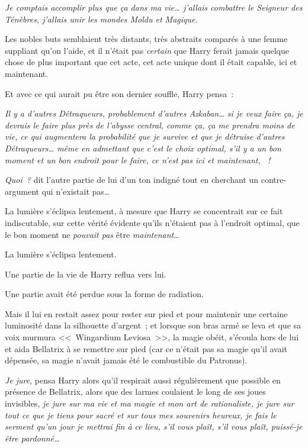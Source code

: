 \emph{Je comptais accomplir plus que ça dans ma vie… j'allais combattre le Seigneur des Ténèbres, j'allais unir les mondes Moldu et Magique.}

Les nobles buts semblaient très distants, très abstraits comparés à une femme suppliant qu'on l'aide, et il n'était pas \emph{certain} que Harry ferait jamais quelque chose de plus important que cet acte, cet acte unique dont il était capable, ici et maintenant.

Et avec ce qui aurait pu être son dernier souffle, Harry pensa~:

\emph{Il y a d'autres Détraqueurs, probablement d'autres Azkaban… si je veux faire ça, je devrais le faire plus près de l'abysse central, comme ça, ça me prendra moins de vie, ce qui augmentera la probabilité que je survive et que je détruise d'autres Détraqueurs… même en admettant que c'est le choix optimal, s'il y a un bon moment et un bon endroit pour le faire, ce n'est pas ici et maintenant, ~!}

\emph{Quoi~?} dit l'autre partie de lui d'un ton indigné tout en cherchant un contre-argument qui n'existait pas…

La lumière s'éclipsa lentement, à mesure que Harry se concentrait sur ce fait indiscutable, sur cette vérité évidente qu'ils n'étaient pas à l'endroit optimal, que le bon moment ne \emph{pouvait pas} être \emph{maintenant}…

La lumière s'éclipsa lentement.

Une partie de la vie de Harry reflua vers lui.

Une partie avait été perdue sous la forme de radiation.

Mais il lui en restait assez pour rester sur pied et pour maintenir une certaine luminosité dans la silhouette d'argent~; et lorsque son bras armé se leva et que sa voix murmura <<~Wingardium Leviosa~>>, la magie obéit, s'écoula hors de lui et aida Bellatrix à se remettre sur pied (car ce n'était pas sa magie qu'il avait dépensée, sa magie n'avait jamais été le combustible du Patronus).

\emph{Je jure}, pensa Harry alors qu'il respirait aussi régulièrement que possible en présence de Bellatrix, alors que des larmes coulaient le long de ses joues invisibles, \emph{je jure sur ma vie et ma magie et mon art de rationaliste, je jure sur tout ce que je tiens pour sacré et sur tous mes souvenirs heureux, je fais le serment qu'un jour je mettrai fin à ce lieu, s'il vous plaît, s'il vous plaît, puissé-je être pardonné…}

